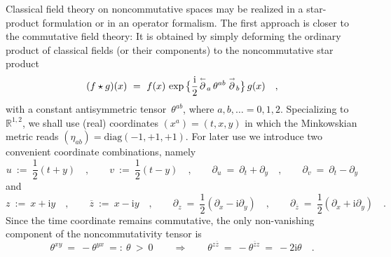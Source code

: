 \documentclass[a4paper,11pt]{article}
\numberwithin{equation}{section}
\def\th{\theta}
\newcommand{\R}{\mathbb R}
\def\i{\mbox{i}}
\def\pa{\mbox{$\partial$}}
\def\sfrac#1#2{{\textstyle\frac{#1}{#2}}}
\def\rd#1{\buildrel{_{_{\hskip 0.01in}\rightarrow}}\over{#1}}
\def\ld#1{\buildrel{_{_{\hskip 0.01in}\leftarrow}}\over{#1}}
\newcommand{\zb}{\overline{z}}
\begin{document}
Classical field theory on noncommutative spaces may be realized
in a star-product formulation or in an operator formalism.
The first approach is closer to the commutative field theory:
It is obtained by simply deforming the ordinary product of classical fields
(or their components) to the noncommutative star product
\begin{equation}
(f \star g)(x)\ =\ f(x)\,\exp\,\bigl\{ \frac{\i}{2}
{\ld{\partial}}_a \,\theta^{ab}\, {\rd{\partial}}_b \bigr\}\,g(x)\quad,
\end{equation}
with a constant antisymmetric tensor~$\th^{ab}$, where $a,b,\ldots=0,1,2$.
Specializing to $\R^{1,2}$, we shall use (real) coordinates $(x^a)=(t,x,y)$
in which the Minkowskian metric reads $(\eta_{ab})=\textrm{diag}(-1,+1,+1)$.
For later use we introduce two convenient coordinate combinations, namely
\begin{equation} \label{lightcone}
u\ :=\ \sfrac{1}{2}(t+y)\quad,\qquad
v\ :=\ \sfrac{1}{2}(t-y)\quad,\qquad
\pa_u\ =\ \pa_t+\pa_y\quad,\qquad
\pa_v\ =\ \pa_t-\pa_y
\end{equation}
and
\begin{equation}
z  \ :=\ x+\i y\quad,\qquad
\zb\ :=\ x-\i y\quad,\qquad
\pa_z    \ =\ \sfrac{1}{2}(\pa_x-\i \pa_y)\quad,\qquad
\pa_{\zb}\ =\ \sfrac{1}{2}(\pa_x+\i \pa_y)\quad.
\end{equation}
Since the time coordinate remains commutative, the only non-vanishing
component of the noncommutativity tensor is
\begin{equation}
\th^{xy}\ =\ -\th^{yx}\ =:\ \th\ >\ 0
\qquad\Longrightarrow\qquad
\th^{z\zb}\ =\ -\th^{\zb z}\ =\ -2\i\th \quad.
\end{equation}
\end{document}
